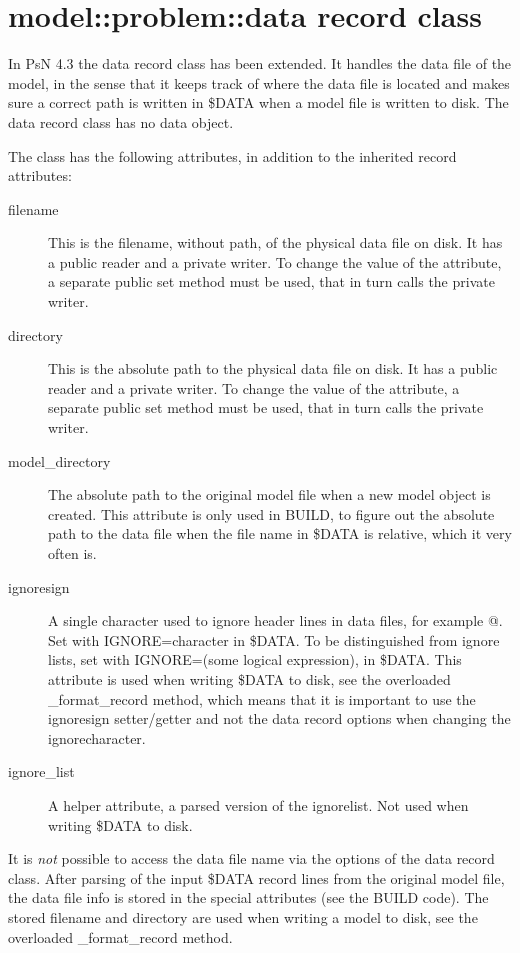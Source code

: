 \section{model::problem::data record class}
In PsN 4.3 the data record class has been extended. It handles the data file of the model, in the sense that it keeps track
of where the data file is located and makes sure a correct path is written in \$DATA when a model file
is written to disk. The data record class has no data object.

The class has the following attributes, in addition to the inherited record attributes:
\begin{description}
\item[filename] This is the filename, without path, of the physical data file on disk. It has a public reader and a private writer. To change the
value of the attribute, a
separate public set method must be used, that in turn calls the private writer.  
\item[directory] This is the absolute path to the physical data file on disk. It has a public reader and a private writer. 
To change the value of the attribute, a
separate public set method must be used, that in turn calls the private writer.  
\item[model\_directory] The absolute path to the original model file when a new model object is created. 
This attribute is only used in BUILD, to figure
out the absolute path to the data file when the file name in \$DATA is relative, which it very often is.
\item[ignoresign] A single character used to ignore header lines in data files, for example @. Set with IGNORE=character
in \$DATA. To be distinguished from ignore lists, set with IGNORE=(some logical expression), in \$DATA. This attribute
is used when writing \$DATA to disk, see the overloaded \_format\_record method, 
which means that it is important to use the ignoresign setter/getter and 
not the data record options when changing the ignorecharacter.
\item[ignore\_list] A helper attribute, a parsed version of the ignorelist. Not used when writing \$DATA to disk.
\end{description}

It is \emph{not} possible to access the data file name via the options of the data record class. After parsing of
the input \$DATA record lines from the original model file, the data file info is stored in the special attributes
(see the BUILD code). The stored filename and directory are used when writing a model to disk, see
the overloaded \_format\_record method.

